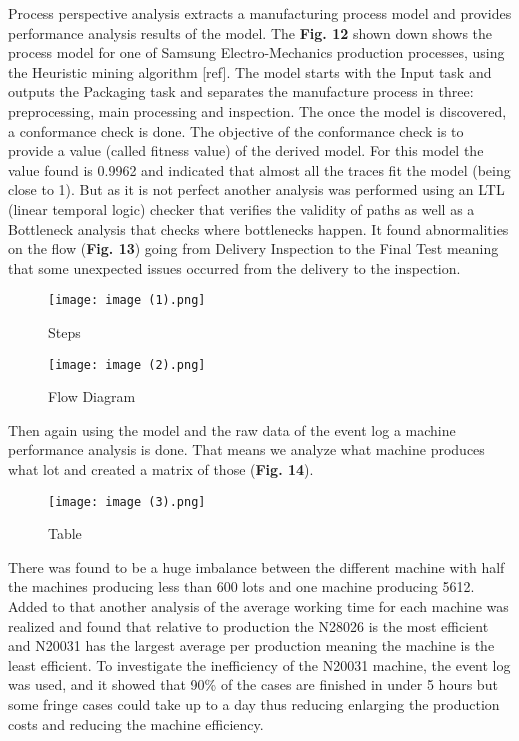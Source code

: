 \documentclass[conference]{IEEEtran}
\begin{document}
Process perspective analysis extracts a manufacturing process model and provides performance analysis results of the model. The \textbf{Fig. 12} shown down shows the process model for one of Samsung Electro-Mechanics production processes, using the Heuristic mining algorithm [ref]. The model starts with the Input task and outputs the Packaging task and separates the manufacture process in three: preprocessing, main processing and inspection. 
The once the model is discovered, a conformance check is done. The objective of the conformance check is to provide a value (called fitness value) of the derived model. For this model the value found is 0.9962 and indicated that almost all the traces fit the model (being close to 1). But as it is not perfect another analysis was performed using an LTL (linear temporal logic) checker that verifies the validity of paths as well as a Bottleneck analysis that checks where bottlenecks happen. It found abnormalities on the flow (\textbf{Fig. 13}) going from Delivery Inspection to the Final Test meaning that some unexpected issues occurred from the delivery to the inspection.

\begin{figure}[htp]
    \centering
    \texttt{[image: image (1).png]}
    \caption{Steps}
    \label{fig:modelDrawn}
\end{figure}

\begin{figure}[htp]
    \centering
    \texttt{[image: image (2).png]}
    \caption{Flow Diagram}
    \label{fig:modelDrawn}
\end{figure}

Then again using the model and the raw data of the event log a machine performance analysis is done. That means we analyze what machine produces what lot and created a matrix of those (\textbf{Fig. 14}).

\begin{figure}[htp]
    \centering
    \texttt{[image: image (3).png]}
    \caption{Table}
    \label{fig:modelDrawn}
\end{figure}

There was found to be a huge imbalance between the different machine with half the machines producing less than 600 lots and one machine producing 5612. Added to that another analysis of the average working time for each machine was realized and found that relative to production the N28026 is the most efficient and N20031 has the largest average per production meaning the machine is the least efficient. To investigate the inefficiency of the N20031 machine, the event log was used, and it showed that 90\% of the cases are finished in under 5 hours but some fringe cases could take up to a day thus reducing enlarging the production costs and reducing the machine efficiency.
\end{document}
